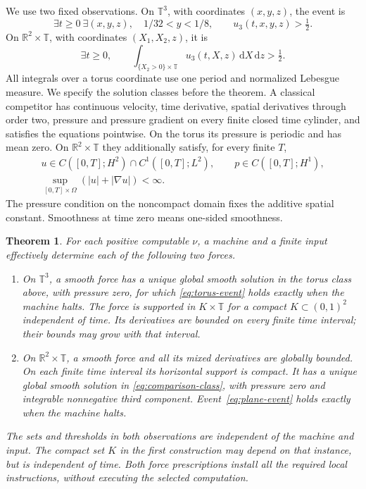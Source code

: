 \documentclass[11pt]{article}
\newtheorem{theorem}{Theorem}[section]
\theoremstyle{definition}
\theoremstyle{remark}
\newcommand{\R}{\mathbb R}
\newcommand{\T}{\mathbb T}
\newcommand{\dd}{\,\mathrm d}
\begin{document}
We use two fixed observations. On $\T^3$, with coordinates $(x,y,z)$,
the event is
\begin{equation}\label{eq:torus-event}
 \exists t\ge0\ \exists (x,y,z),\quad
 1/32<y<1/8,\qquad u_3(t,x,y,z)>\tfrac12.
\end{equation}
On $\R^2\times\T$, with coordinates $(X_1,X_2,z)$, it is
\begin{equation}\label{eq:plane-event}
 \exists t\ge0,\qquad
 \int_{\{X_2>0\}\times\T}u_3(t,X,z)\dd X\dd z>\tfrac12.
\end{equation}
All integrals over a torus coordinate use one period and normalized
Lebesgue measure. We specify the solution classes before the theorem.
A classical competitor has continuous velocity, time derivative, spatial
derivatives through order two, pressure and pressure gradient on every
finite closed time cylinder, and satisfies the equations pointwise.
On the torus its pressure is periodic and has mean zero.
On $\R^2\times\T$ they additionally satisfy, for every finite $T$,
\begin{equation}\label{eq:comparison-class}
 \begin{gathered}
 u\in C([0,T];H^2)\cap C^1([0,T];L^2),\qquad
 p\in C([0,T];H^1),\\
 \sup_{[0,T]\times\Omega}(|u|+|\nabla u|)<\infty.
 \end{gathered}
\end{equation}
The pressure condition on the noncompact domain fixes the additive
spatial constant. Smoothness at time zero means one-sided smoothness.

\begin{theorem}\label{thm:main}
For each positive computable $\nu$, a machine and a finite input
effectively determine each of the following two forces.
\begin{enumerate}
\item On $\T^3$, a smooth force has a unique global smooth solution
in the torus class above, with pressure zero, for which
\eqref{eq:torus-event} holds exactly when the machine halts.
The force is supported in $K\times\T$ for a compact
$K\subset(0,1)^2$ independent of time. Its derivatives are bounded on every finite time
interval; their bounds may grow with that interval.
\item On $\R^2\times\T$, a smooth force and all its mixed derivatives
are globally bounded. On each finite time interval its horizontal
support is compact. It has a unique global smooth solution in
\eqref{eq:comparison-class}, with pressure zero and integrable
nonnegative third component. Event~\eqref{eq:plane-event} holds exactly
when the machine halts.
\end{enumerate}
The sets and thresholds in both observations are independent of the
machine and input. The compact set $K$ in the first construction may
depend on that instance, but is independent of time. Both force prescriptions install all the required
local instructions, without executing the selected computation.
\end{theorem}
\end{document}
